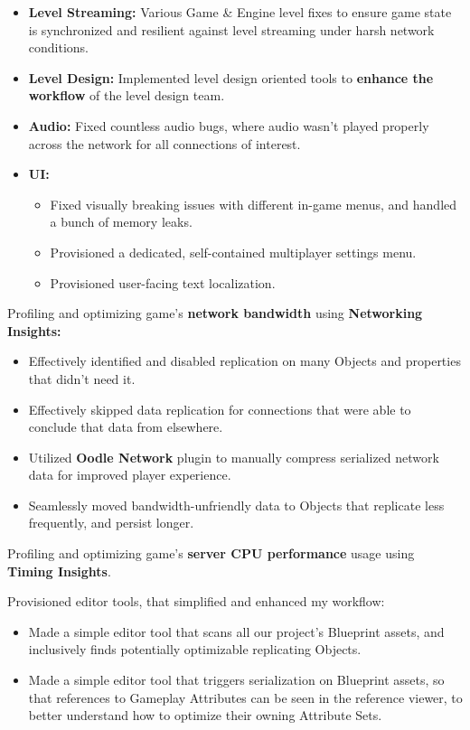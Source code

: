 \begin{cventries}
{\begin{cvitems}
{\begin{itemize}
            \item {\textbf{Level Streaming:} Various Game \& Engine level fixes to ensure game state is synchronized and resilient against level streaming under harsh network conditions.}
            \item {\textbf{Level Design:} Implemented level design oriented tools to \textbf{enhance the workflow} of the level design team.}
            \item {\textbf{Audio:} Fixed countless audio bugs, where audio wasn't played properly across the network for all connections of interest.}
            \item {\textbf{UI:}
              \begin{itemize}
                \item {Fixed visually breaking issues with different in-game menus, and handled a bunch of memory leaks.}
                \item {Provisioned a dedicated, self-contained multiplayer settings menu.}
                \item {Provisioned user-facing text localization.}
              \end{itemize}
            }
          \end{itemize}
        }
        \item {Profiling and optimizing game's \textbf{network bandwidth} using \textbf{Networking Insights:}
        \begin{itemize}
          \item {Effectively identified and disabled replication on many Objects and properties that didn't need it.}
          \item {Effectively skipped data replication for connections that were able to conclude that data from elsewhere.}
          \item {Utilized \textbf{Oodle Network} plugin to manually compress serialized network data for improved player experience.}
          \item {Seamlessly moved bandwidth-unfriendly data to Objects that replicate less frequently, and persist longer.}
        \end{itemize}
        }
        \item {Profiling and optimizing game's \textbf{server CPU performance} usage using \textbf{Timing Insights}.}
        \item {Provisioned editor tools, that simplified and enhanced my workflow:
        \begin{itemize}
          \item {Made a simple editor tool that scans all our project's Blueprint assets, and inclusively finds potentially optimizable replicating Objects.}
          \item {Made a simple editor tool that triggers serialization on Blueprint assets, so that references to Gameplay Attributes can be seen in the reference viewer, to better understand how to optimize their owning Attribute Sets.}
        \end{itemize}
        }
      \end{cvitems}
    }


\end{cventries}
